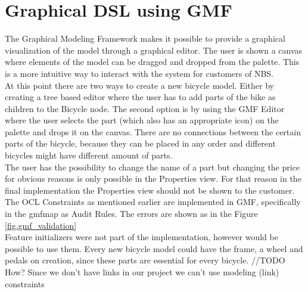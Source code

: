 \section{Graphical DSL using GMF}
\label{sec.gmf}

\noindent The Graphical Modeling Framework makes it possible to provide a 
graphical visualization of the model through a graphical editor. 
The user is shown a canvas where elements of the model can be dragged 
and dropped from the palette. This is a more intuitive way to interact 
with the system for customers of NBS.\\
\noindent At this point there are two ways to create a new bicycle model. 
Either by creating a tree based editor where the user has to add 
parts of the bike as children to the Bicycle node. The second option 
is by using the GMF Editor where the user selects the part (which also 
has an appropriate icon) on the palette and drops it on the canvas.
There are no connections between the certain parts of the bicycle, 
because they can be placed in any order and different bicycles might 
have different amount of parts.\\
\noindent The user has the possibility to change the name of a part but changing 
the price for obvious reasons is only possible in the Properties view. 
For that reason in the final implementation the Properties view should 
not be shown to the customer. The OCL Constraints as mentioned earlier 
are implemented in GMF, specifically in the gmfmap as Audit Rules.
The errors are shown as in the Figure \ref{fig.gmf_validation}\\
\noindent Feature initializers were not part of the implementation, however
would be possible to use them. Every new bicycle model could have the
frame, a wheel and pedals on creation, since these parts are essential for every
bicycle. //TODO How?
\noindent Since we don't have links in our project we can't use modeling (link) constraints
